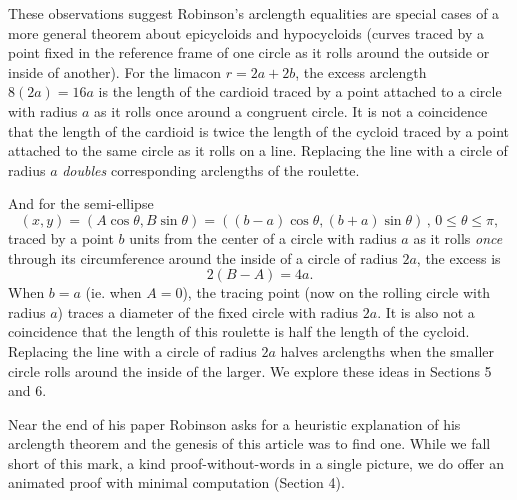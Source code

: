 \documentclass{ximera}
\begin{document}
These observations suggest Robinson's arclength equalities are special cases of a more general theorem about epicycloids and hypocycloids (curves traced by a point fixed in the reference frame of one circle as it rolls around the outside or inside of another). For the limacon $r= 2a+2b$, the excess arclength $8(2a) = 16a$ is the length of the cardioid traced by a point attached to a circle with radius $a$ as it rolls once around a congruent circle. It is not a coincidence that the length of the cardioid
is twice the length of the cycloid traced by a point attached to the same circle as it rolls on a line. Replacing the line with a circle of radius $a$ \emph{doubles} corresponding arclengths of the roulette.

And for the semi-ellipse 
\[
    (x,y) = (A\cos\theta, B\sin\theta) =  ((b-a)\cos\theta , (b+a)\sin\theta) \, , \, 0\leq \theta \leq \pi, 
\]
traced by a point $b$ units from the center of a circle with radius $a$ as it rolls \emph{once} through its circumference around the inside of a circle of radius $2a$, the excess is
\[
     2(B-A) = 4a . 
\]
When $b=a$ (ie. when $A=0$), the tracing point (now on the rolling circle with radius $a$) traces a diameter of the fixed circle with radius $2a$. It is also not a coincidence that the length of this roulette is half the length of the cycloid. Replacing the line with a circle of radius $2a$ halves arclengths when the smaller circle rolls around the inside of the larger. We explore these ideas in Sections 5 and 6. 


Near the end of his paper Robinson asks for a heuristic explanation of his arclength theorem and the genesis of this article was to find one. While we fall short of this mark, a kind proof-without-words in a single picture, we do offer an animated proof with minimal computation (Section 4). 




\end{document}
